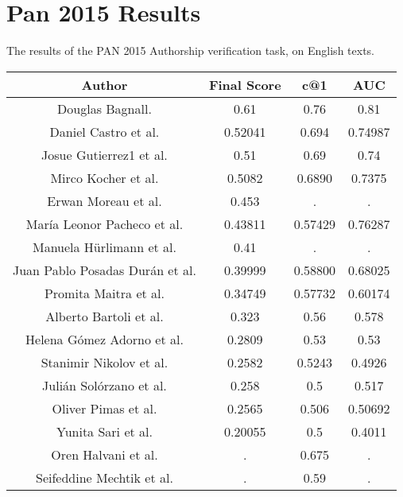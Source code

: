 \section{Pan 2015 Results} \label{sec:appendix:pan_2015_results}
The results of the PAN 2015 Authorship verification task, on English texts.

\begin{center}
\begin{tabular}{|c|c|c|c|}
\hline
\textbf{Author}          & \textbf{Final Score} & \textbf{c@1} & \textbf{AUC} \\ \hline
Douglas Bagnall. & 0.61 & 0.76 & 0.81 \\ \hline
Daniel Castro et al. & 0.52041 & 0.694 & 0.74987\\ \hline
Josue Gutierrez1 et al. & 0.51 & 0.69 & 0.74 \\ \hline
Mirco Kocher et al. & 0.5082 & 0.6890 & 0.7375 \\ \hline
Erwan Moreau et al. & 0.453 & . & . \\ \hline
María Leonor Pacheco et al. & 0.43811 & 0.57429 & 0.76287 \\ \hline
Manuela Hürlimann et al. & 0.41 & . & . \\ \hline
Juan Pablo Posadas Durán et al. & 0.39999 & 0.58800 & 0.68025 \\ \hline
Promita Maitra et al. & 0.34749  & 0.57732 & 0.60174 \\ \hline
Alberto Bartoli et al. & 0.323 & 0.56 & 0.578 \\ \hline
Helena Gómez Adorno et al. & 0.2809 & 0.53 & 0.53 \\ \hline
Stanimir Nikolov et al. & 0.2582 & 0.5243 & 0.4926 \\ \hline
Julián Solórzano et al. & 0.258 & 0.5 & 0.517 \\ \hline
Oliver Pimas et al. & 0.2565  & 0.506 & 0.50692 \\ \hline
Yunita Sari et al. & 0.20055 & 0.5 & 0.4011 \\ \hline
Oren Halvani et al. & . & 0.675 & . \\ \hline
Seifeddine Mechtik et al. & .  & 0.59 & . \\ \hline
\end{tabular}
\end{center}
